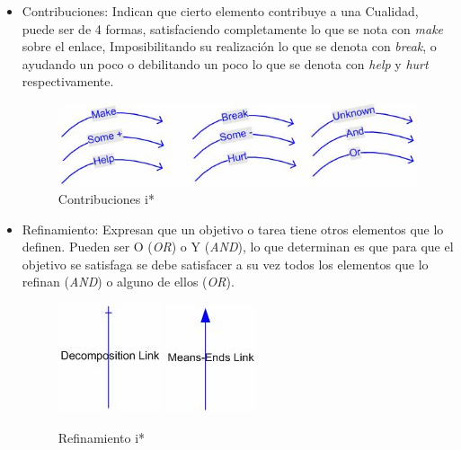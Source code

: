 \begin{itemize}
\begin{itemize}
            \item Contribuciones: Indican que cierto elemento contribuye a una Cualidad, puede ser de 4 formas, satisfaciendo completamente lo que se nota con \textit{make} sobre el enlace, Imposibilitando su realización lo que se denota con \textit{break}, o ayudando un poco o debilitando un poco lo que se denota con \textit{help} y \textit{hurt} respectivamente.
            \begin{figure}[h!]
                \centering
                \includegraphics[scale=0.6]{media/imagenes/i_star/sintaxis/contribuitonlinks.jpg}
                \caption{Contribuciones \gls{i*}}
            \end{figure}
            
            \item Refinamiento: Expresan que un objetivo o tarea tiene otros elementos que lo definen. Pueden ser O (\textit{OR}) o Y (\textit{AND}), lo que determinan es que para que el objetivo se satisfaga se debe satisfacer a su vez todos los elementos que lo refinan (\textit{AND}) o alguno de ellos (\textit{OR}).
            \begin{figure}[h!]
                \centering
                \includegraphics[scale=0.6]{media/imagenes/i_star/sintaxis/decomposition.jpg}
                \includegraphics[scale=0.6]{media/imagenes/i_star/sintaxis/meansendslink.jpg}
                \caption{Refinamiento \gls{i*}}
            \end{figure}
        \end{itemize}
    \end{itemize}
